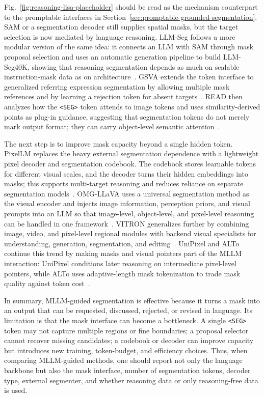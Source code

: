 Fig.~\ref{fig:reasoning-lisa-placeholder} should be read as the mechanism counterpart to the promptable interfaces in Section~\ref{sec:promptable-grounded-segmentation}. SAM or a segmentation decoder still supplies spatial masks, but the target selection is now mediated by language reasoning. LLM-Seg follows a more modular version of the same idea: it connects an LLM with SAM through mask proposal selection and uses an automatic generation pipeline to build LLM-Seg40K, showing that reasoning segmentation depends as much on scalable instruction-mask data as on architecture~\citep{jwangLlmsegBridgingImage2024}. GSVA extends the token interface to generalized referring expression segmentation by allowing multiple mask references and by learning a rejection token for absent targets~\citep{xiaGsvaGeneralizedSegmentation2024}. READ then analyzes how the \texttt{<SEG>} token attends to image tokens and uses similarity-derived points as plug-in guidance, suggesting that segmentation tokens do not merely mark output format; they can carry object-level semantic attention~\citep{qianReasoningAttendTry2025}.



The next step is to improve mask capacity beyond a single hidden token. PixelLM replaces the heavy external segmentation dependence with a lightweight pixel decoder and segmentation codebook. The codebook stores learnable tokens for different visual scales, and the decoder turns their hidden embeddings into masks; this supports multi-target reasoning and reduces reliance on separate segmentation models~\citep{renPixellmPixelReasoning2024}. OMG-LLaVA uses a universal segmentation method as the visual encoder and injects image information, perception priors, and visual prompts into an LLM so that image-level, object-level, and pixel-level reasoning can be handled in one framework~\citep{zhangOmgllavaBridgingImagelevel2024}. VITRON generalizes further by combining image, video, and pixel-level regional modules with backend visual specialists for understanding, generation, segmentation, and editing~\citep{feiVitronUnifiedPixellevel2024}. UniPixel and ALTo continue this trend by making masks and visual pointers part of the MLLM interaction: UniPixel conditions later reasoning on intermediate pixel-level pointers, while ALTo uses adaptive-length mask tokenization to trade mask quality against token cost~\citep{liuUnipixelUnifiedObject2026,wangAltoAdaptivelengthTokenizer2026}.

In summary, MLLM-guided segmentation is effective because it turns a mask into an output that can be requested, discussed, rejected, or revised in language. Its limitation is that the mask interface can become a bottleneck. A single \texttt{<SEG>} token may not capture multiple regions or fine boundaries; a proposal selector cannot recover missing candidates; a codebook or decoder can improve capacity but introduces new training, token-budget, and efficiency choices. Thus, when comparing MLLM-guided methods, one should report not only the language backbone but also the mask interface, number of segmentation tokens, decoder type, external segmenter, and whether reasoning data or only reasoning-free data is used.


